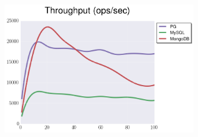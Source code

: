 \documentclass[usenames,dvipsnames, 18pt, compress, aspectratio=169]{beamer}
\begin{document}
\begin{frame}
    \frametitle{}
    \begin{center}
    \begin{figure}
        \includegraphics[width=0.75\textwidth,center]{benchmarks/select_jsonb_path_ops_no_parse_throughput.png}
    \end{figure}
    \end{center}
\end{frame}





\end{document}
